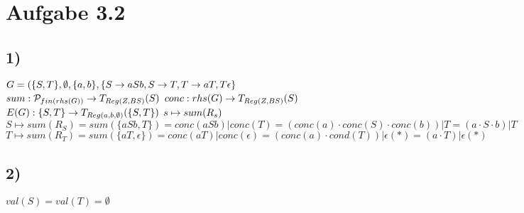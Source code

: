 \section*{Aufgabe 3.2}
\subsection*{1)}
$G=(\{S,T\},\emptyset,\{a,b\},\{S\rightarrow aSb, S\rightarrow T, T\rightarrow aT, T\epsilon\}\\$
$sum: \mathcal{P}_{fin(rhs(G))}\rightarrow T_{Reg(Z,BS)}(S)\\$
$conc: rhs(G)\rightarrow T_{Reg(Z,BS)}(S)\\$
$E(G): \{S,T\} \rightarrow T_{Reg({a,b},\emptyset)}(\{S,T\})\\$
$s\mapsto sum(R_s)\\$
$S\mapsto sum(R_S)=sum(\{aSb,T\})=conc(aSb)|conc(T)=(conc(a)\cdot conc(S)\cdot conc(b))|T=(a\cdot S\cdot b)|T$\\
$T\mapsto sum(R_T)=sum(\{aT,\epsilon\})=conc(aT)|conc(\epsilon)=(conc(a)\cdot cond(T))|\epsilon(*)=(a\cdot T)|\epsilon(*)$
\subsection*{2)}
$val(S)=val(T)=\emptyset$
